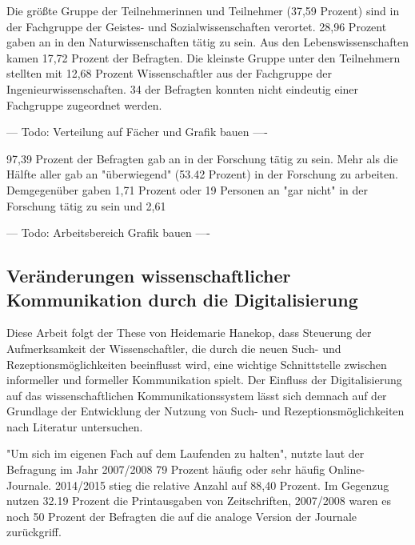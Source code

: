Die größte Gruppe der Teilnehmerinnen und Teilnehmer (37,59 Prozent) sind in der Fachgruppe der Geistes- und Sozialwissenschaften verortet. 28,96 Prozent gaben an in den Naturwissenschaften tätig zu sein. Aus den Lebenswissenschaften kamen 17,72 Prozent der Befragten. Die kleinste Gruppe unter den Teilnehmern stellten mit 12,68 Prozent Wissenschaftler aus der Fachgruppe der Ingenieurwissenschaften. 34 der Befragten konnten nicht eindeutig einer Fachgruppe zugeordnet werden.

--- Todo: Verteilung auf Fächer und Grafik bauen ----

97,39 Prozent der Befragten gab an in der Forschung tätig zu sein. Mehr als die Hälfte aller gab an "überwiegend" (53.42 Prozent) in der Forschung zu arbeiten. Demgegenüber gaben 1,71 Prozent oder 19 Personen an "gar nicht" in der Forschung tätig zu sein und 2,61%

--- Todo: Arbeitsbereich Grafik bauen ----

\subsection{Veränderungen wissenschaftlicher Kommunikation durch die Digitalisierung}

Diese Arbeit folgt der These von Heidemarie Hanekop, dass Steuerung der Aufmerksamkeit der Wissenschaftler, die durch die neuen Such- und Rezeptionsmöglichkeiten beeinflusst wird, eine wichtige Schnittstelle zwischen informeller und formeller Kommunikation spielt\cite{Hanekop_2014}. Der Einfluss der Digitalisierung auf das wissenschaftlichen Kommunikationssystem lässt sich demnach auf der Grundlage der Entwicklung der Nutzung von Such- und Rezeptionsmöglichkeiten nach Literatur untersuchen.

"Um sich im eigenen Fach auf dem Laufenden zu halten", nutzte laut der Befragung im Jahr 2007/2008 79 Prozent häufig oder sehr häufig Online-Journale. 2014/2015 stieg die relative Anzahl auf 88,40 Prozent. Im Gegenzug nutzen 32.19 Prozent die Printausgaben von Zeitschriften, 2007/2008 waren es noch 50 Prozent der Befragten die auf die analoge Version der Journale zurückgriff.


